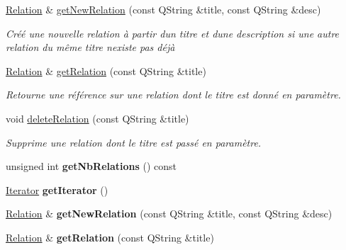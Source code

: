 \begin{DoxyCompactItemize}
\item 
\hyperlink{class_relation}{Relation} \& \hyperlink{class_relation_manager_a1f9d556e0505105205e1fdb4905c4a80}{get\+New\+Relation} (const Q\+String \&title, const Q\+String \&desc)
\begin{DoxyCompactList}\small\item\em Créé une nouvelle relation à partir d\textquotesingle{}un titre et d\textquotesingle{}une description si une autre relation du même titre n\textquotesingle{}existe pas déjà \end{DoxyCompactList}\item 
\hyperlink{class_relation}{Relation} \& \hyperlink{class_relation_manager_ad9ffbaba761149560d915f081d379ecc}{get\+Relation} (const Q\+String \&title)
\begin{DoxyCompactList}\small\item\em Retourne une référence sur une relation dont le titre est donné en paramètre. \end{DoxyCompactList}\item 
void \hyperlink{class_relation_manager_a074413b3ed72a1342821e911c1fa3587}{delete\+Relation} (const Q\+String \&title)
\begin{DoxyCompactList}\small\item\em Supprime une relation dont le titre est passé en paramètre. \end{DoxyCompactList}\item 
\mbox{\label{class_relation_manager_a52a7eb1d368bf881c5acaf45650e45b0}} 
unsigned int {\bfseries get\+Nb\+Relations} () const
\item 
\mbox{\label{class_relation_manager_aefe037f480e43c5c7e786cb13b3f1084}} 
\hyperlink{class_relation_manager_1_1_iterator}{Iterator} {\bfseries get\+Iterator} ()
\item 
\mbox{\label{class_relation_manager_a6d758195fc82d8bc0fff5622a675e7ce}} 
\hyperlink{class_relation}{Relation} \& {\bfseries get\+New\+Relation} (const Q\+String \&title, const Q\+String \&desc)
\item 
\mbox{\label{class_relation_manager_a93e61e07638f39ccf0985cd876e5f285}} 
\hyperlink{class_relation}{Relation} \& {\bfseries get\+Relation} (const Q\+String \&title)

\end{DoxyCompactItemize}
